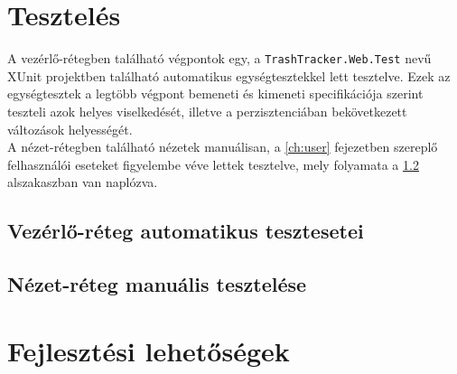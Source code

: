 \section{Tesztelés}

A vezérlő-rétegben található végpontok egy, a \texttt{TrashTracker.Web.Test} nevű XUnit projektben található automatikus egységtesztekkel lett tesztelve. Ezek az egységtesztek a legtöbb végpont bemeneti és kimeneti specifikációja szerint teszteli azok helyes viselkedését, illetve a perzisztenciában bekövetkezett változások helyességét.\\
A nézet-rétegben található nézetek manuálisan, a \ref{ch:user} fejezetben szereplő felhasználói eseteket figyelembe véve lettek tesztelve, mely folyamata a \ref{subsec:manual_test} alszakaszban van naplózva.

\subsection{Vezérlő-réteg automatikus tesztesetei}

\subsection{Nézet-réteg manuális tesztelése}
\label{subsec:manual_test}

\section{Fejlesztési lehetőségek}